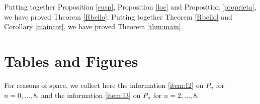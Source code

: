 \documentclass{amsart}
\newtheorem{lemma}{Lemma}[section]
\theoremstyle{definition}
\theoremstyle{remark}
\begin{document}
Putting together Proposition \ref{cusp}, Proposition \ref{loc} and Proposition \ref{proprieta}, we have proved Theorem \ref{Rbello}.
Putting together Theorem \ref{Rbello} and Corollary \ref{maincor}, we have proved Theorem \ref{thm:main}.







\section*{Tables and Figures}\label{appx}
For reasons of space, we collect here the information \ref{item:I2} on $P_n$ for $n=0,\dots,8$, and the information \ref{item:I3} on $P_n$ for $n=2,\dots,8$.

\end{document}
